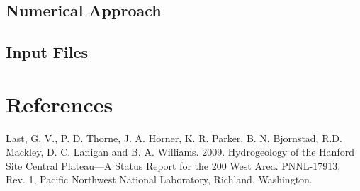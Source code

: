 \documentclass[12pt]{article}
\begin{document}
\subsection{Numerical Approach}

\subsection{Input Files}

\section{References}

Last, G. V., P. D. Thorne, J. A. Horner, K. R. Parker, B. N. Bjornstad, R.D. Mackley, D. C. Lanigan and B. A. Williams. 2009. Hydrogeology of the Hanford Site Central Plateau---A Status Report for the 200 West Area. PNNL-17913, Rev. 1, Pacific Northwest National Laboratory, Richland, Washington.
\end{document}
